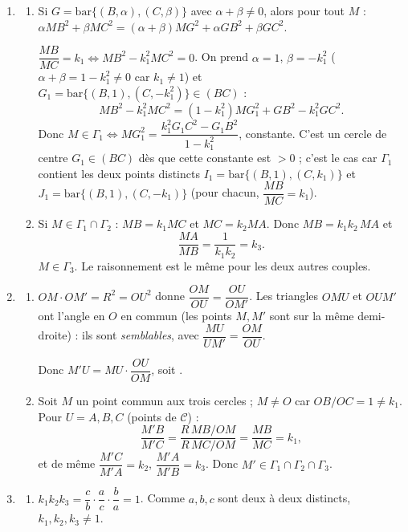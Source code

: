 \begin{enumerate}[itemsep=14pt]
  \item\leavevmode
  \begin{enumerate}[itemsep=8pt]
    \item\leavevmode
    \begin{prop}
    Si $G=\text{bar}\{(B,\alpha),(C,\beta)\}$ avec $\alpha+\beta\neq0$, alors pour tout $M$ :
    \textbf{$\alpha MB^2+\beta MC^2=(\alpha+\beta)MG^2+\alpha GB^2+\beta GC^2$}.
    \end{prop}
    $\dfrac{MB}{MC}=k_1\iff MB^2-k_1^2MC^2=0$. On prend $\alpha=1$, $\beta=-k_1^2$ ($\alpha+\beta=1-k_1^2\neq0$ car $k_1\neq1$) et $G_1=\text{bar}\{(B,1),(C,-k_1^2)\}\in(BC)$ :
    \[MB^2-k_1^2MC^2=(1-k_1^2)MG_1^2+GB^2-k_1^2GC^2.\]
    Donc $M\in\Gamma_1\iff MG_1^2=\dfrac{k_1^2G_1C^2-G_1B^2}{1-k_1^2}$, constante. C'est un cercle de centre $G_1\in(BC)$ dès que cette constante est $>0$ ; c'est le cas car $\Gamma_1$ contient les deux points distincts $I_1=\text{bar}\{(B,1),(C,k_1)\}$ et $J_1=\text{bar}\{(B,1),(C,-k_1)\}$ (pour chacun, $\dfrac{MB}{MC}=k_1$).

    \item Si $M\in\Gamma_1\cap\Gamma_2$ : $MB=k_1MC$ et $MC=k_2MA$. Donc $MB=k_1k_2\,MA$ et
    \[\dfrac{MA}{MB}=\dfrac1{k_1k_2}=k_3.\]
    $M\in\Gamma_3$. Le raisonnement est le même pour les deux autres couples.
  \end{enumerate}

  \item\leavevmode
  \begin{enumerate}[itemsep=8pt]
    \item $OM\cdot OM'=R^2=OU^2$ donne $\dfrac{OM}{OU}=\dfrac{OU}{OM'}$. Les triangles $OMU$ et $OUM'$ ont l'angle en $O$ en commun (les points $M,M'$ sont sur la même demi-droite) : ils sont \emph{semblables}, avec $\dfrac{MU}{UM'}=\dfrac{OM}{OU}$.

    Donc $M'U=MU\cdot\dfrac{OU}{OM}$, soit .
    \item Soit $M$ un point commun aux trois cercles ; $M\neq O$ car $OB/OC=1\neq k_1$. Pour $U=A,B,C$ (points de $\mathcal C$) :
    \[\dfrac{M'B}{M'C}=\dfrac{R\,MB/OM}{R\,MC/OM}=\dfrac{MB}{MC}=k_1,\]
    et de même $\dfrac{M'C}{M'A}=k_2$, $\dfrac{M'A}{M'B}=k_3$. Donc $M'\in\Gamma_1\cap\Gamma_2\cap\Gamma_3$.
  \end{enumerate}

  \item\leavevmode
  \begin{enumerate}[itemsep=8pt]
    \item $k_1k_2k_3=\dfrac cb\cdot\dfrac ac\cdot\dfrac ba=1$. Comme $a,b,c$ sont deux à deux distincts, $k_1,k_2,k_3\neq1$.


\end{enumerate}
\end{enumerate}
